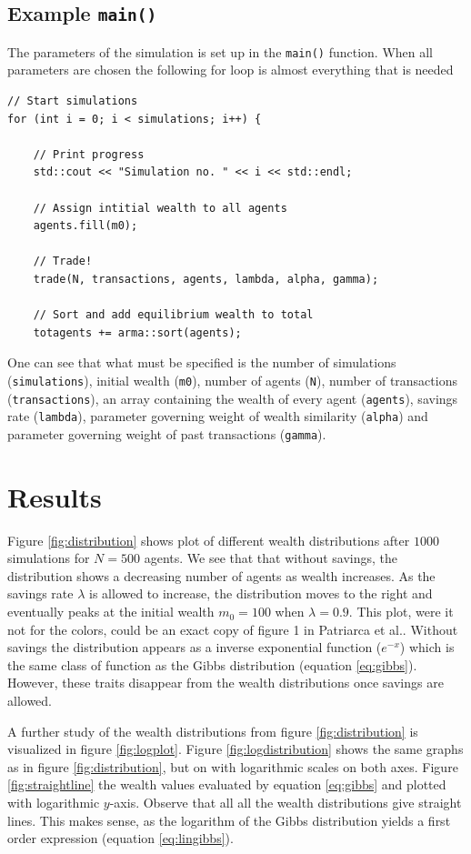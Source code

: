 \documentclass[10pt, a4paper]{amsart}
\begin{document}
\subsection{Example \lstinline|main()|}
The parameters of the simulation is set up in the \lstinline|main()| function. When all parameters are chosen the following for loop is almost everything that is needed
\begin{lstlisting}
// Start simulations
for (int i = 0; i < simulations; i++) {

	// Print progress
	std::cout << "Simulation no. " << i << std::endl;

	// Assign intitial wealth to all agents
	agents.fill(m0);

	// Trade!
	trade(N, transactions, agents, lambda, alpha, gamma);

	// Sort and add equilibrium wealth to total
	totagents += arma::sort(agents);
\end{lstlisting}
One can see that what must be specified is the number of simulations (\lstinline|simulations|), initial wealth (\lstinline|m0|), number of agents (\lstinline|N|), number of transactions (\lstinline|transactions|), an array containing the wealth of every agent (\lstinline|agents|), savings rate (\lstinline|lambda|), parameter governing weight of wealth similarity (\lstinline|alpha|) and parameter governing weight of past transactions (\lstinline|gamma|).


\section{Results}

Figure \ref{fig:distribution} shows plot of different wealth distributions after $1000$ simulations for $N=500$ agents. We see that that without savings, the distribution shows a decreasing number of agents as wealth increases. As the savings rate $\lambda$ is allowed to increase, the distribution moves to the right and eventually peaks at the initial wealth $m_0 = 100$ when $\lambda = 0.9$. This plot, were it not for the colors, could be an exact copy of figure 1 in Patriarca et al.\cite{Patriarca}. Without savings the distribution appears as a inverse exponential function ($e^{-x}$) which is the same class of function as the Gibbs distribution (equation \ref{eq:gibbs}). However, these traits disappear from the wealth distributions once savings are allowed.

A further study of the wealth distributions from figure \ref{fig:distribution} is visualized in figure \ref{fig:logplot}. Figure  \ref{fig:logdistribution} shows the same graphs as in figure \ref{fig:distribution}, but on with logarithmic scales on both axes. Figure \ref{fig:straightline} the wealth values evaluated by equation \ref{eq:gibbs} and plotted with logarithmic $y$-axis. Observe that all all the wealth distributions give straight lines. This makes sense, as the logarithm of the Gibbs distribution yields a first order expression (equation \ref{eq:lingibbs}).
\end{document}

